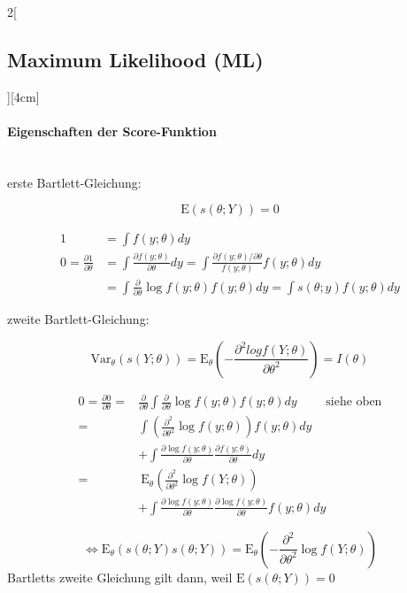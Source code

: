 \documentclass[8pt]{extarticle}
\begin{document}
\begin{multicols}{2}[\subsection{Maximum Likelihood (ML)}][4cm]
  
  \paragraph{Eigenschaften der Score-Funktion} \ \\
  
  erste Bartlett-Gleichung:
  
  $$\mathrm{E}\left(s(\theta;Y)\right) = 0$$
  
\begin{Proof}
\vspace{-1.5em}
\begin{align*}
1 &= \int f(y;\theta) dy \\
0 = \frac{\partial 1}{\partial\theta} &= \int \frac{\partial f(y;\theta)}{\partial \theta}dy = \int \frac{\partial f(y;\theta) / \partial\theta}{f(y;\theta)} f(y;\theta) dy \\ &= \int \frac{\partial}{\partial\theta} \log f(y;\theta) f(y;\theta) dy = \int s(\theta;y) f(y;\theta) dy
\end{align*}
\end{Proof}
  
  zweite Bartlett-Gleichung:
  
  $$\mathrm{Var}_\theta\left(s(Y;\theta)\right) = \mathrm{E}_\theta\left(-\frac{\partial^2 log f(Y;\theta)}{\partial\theta^2}\right) = I(\theta)$$
  
\begin{Proof}
\vspace{-1.5em}
\begin{align*}
0 = \frac{\partial 0}{\partial \theta} =& \frac{\partial}{\partial\theta}\int \frac{\partial}{\partial\theta} \log f(y;\theta) f(y;\theta) dy \hspace{2em}\text{      siehe oben}\\
=& \int \left( \frac{\partial^2}{\partial \theta^2} \log f(y;\theta)\right) f(y;\theta) dy  \\
&+ \int\frac{\partial \log f(y;\theta)}{\partial \theta}\frac{\partial f(y;\theta)}{\partial \theta}dy \\
=& \: \mathrm{E}_\theta \left( \frac{\partial^2}{\partial \theta^2} \log f(Y;\theta)\right)  \\
&+ \int\frac{\partial \log f(y;\theta)}{\partial \theta}\frac{\partial \log f(y;\theta)}{\partial \theta} f(y;\theta) dy 
\end{align*}

$$\Leftrightarrow \mathrm{E}_\theta \left(s(\theta;Y) s(\theta;Y)\right) = \mathrm{E}_\theta \left(- \frac{\partial^2}{\partial \theta^2} \log f(Y;\theta)\right)$$
\noindent Bartletts zweite Gleichung gilt dann, weil $\mathrm{E}\left(s(\theta;Y)\right) = 0$
\end{Proof}
  

\end{multicols}
\end{document}
